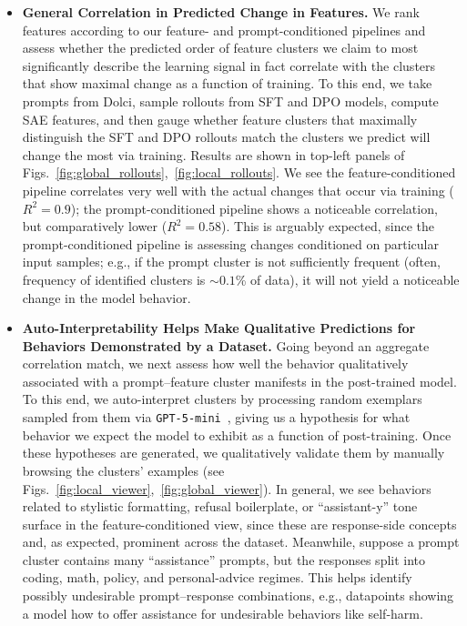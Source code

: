\documentclass{article} %
\begin{document}
\begin{itemize}[leftmargin=*]
    \item \textbf{General Correlation in Predicted Change in Features.} We rank features according to our feature- and prompt-conditioned pipelines and assess whether the predicted order of feature clusters we claim to most significantly describe the learning signal in fact correlate with the clusters that show maximal change as a function of training. 
    To this end, we take prompts from Dolci, sample rollouts from SFT and DPO models, compute SAE features, and then gauge whether feature clusters that maximally distinguish the SFT and DPO rollouts match the clusters we predict will change the most via training.
    Results are shown in top-left panels of Figs.~\ref{fig:global_rollouts},~\ref{fig:local_rollouts}.
    We see the feature-conditioned pipeline correlates very well with the actual changes that occur via training ($R^2=0.9$); the prompt-conditioned pipeline shows a noticeable correlation, but comparatively lower ($R^2=0.58$).
    This is arguably expected, since the prompt-conditioned pipeline is assessing changes conditioned on particular input samples; e.g., if the prompt cluster is not sufficiently frequent (often, frequency of identified clusters is $\sim0.1$\% of data), it will not yield a noticeable change in the model behavior.
    
    \item \textbf{Auto-Interpretability Helps Make Qualitative Predictions for Behaviors Demonstrated by a Dataset.}
    Going beyond an aggregate correlation match, we next assess how well the behavior qualitatively associated with a prompt--feature cluster manifests in the post-trained model.
    To this end, we auto-interpret clusters by processing random exemplars sampled from them via {\texttt{GPT-5-mini}}~\citep{paulo2024automatically, karvonen2025saebench}, giving us a hypothesis for what behavior we expect the model to exhibit as a function of post-training.
    Once these hypotheses are generated, we qualitatively validate them by manually browsing the clusters' examples (see Figs.~\ref{fig:local_viewer},~\ref{fig:global_viewer}).
    In general, we see behaviors related to stylistic formatting, refusal boilerplate, or ``assistant-y'' tone surface in the feature-conditioned view, since these are response-side concepts and, as expected, prominent across the dataset. 
    Meanwhile, suppose a prompt cluster contains many ``assistance'' prompts, but the responses split into coding, math, policy, and personal-advice regimes. 
    This helps identify possibly undesirable prompt--response combinations, e.g., datapoints showing a model how to offer assistance for undesirable behaviors like self-harm.    
    

\end{itemize}
\end{document}
